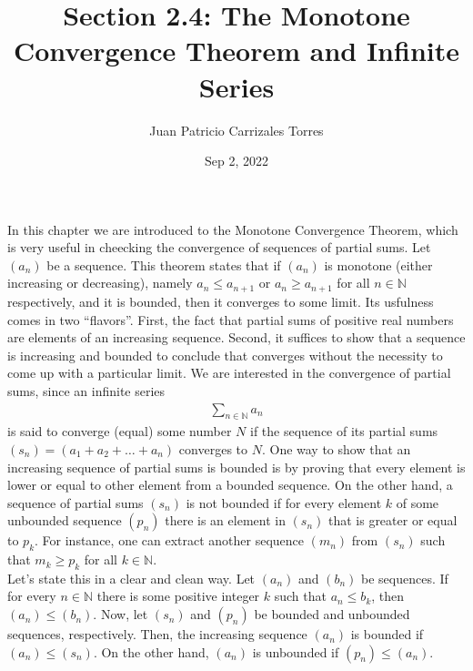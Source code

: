 \documentclass[12pt]{article}
\newcommand{\N}{\mathbb{N}}
\begin{document}
  
\title{Section 2.4: The Monotone Convergence Theorem and Infinite Series}
   \author{Juan Patricio Carrizales Torres}
     \date{Sep 2, 2022}
       \maketitle

       In this chapter we are introduced to the Monotone Convergence Theorem, which is very useful in cheecking the convergence of sequences of partial sums. Let $(a_{n})$ be a sequence. This theorem states that if $(a_{n})$ is monotone (either increasing or decreasing), namely $a_{n} \leq a_{n+1}$ or $a_{n}\geq a_{n+1}$ for all $n\in \N$ respectively, and it is bounded, then it converges to some limit. Its usfulness comes in two ``flavors''. First, the fact that partial sums of positive real numbers are elements of an increasing sequence. Second, it suffices to show that a sequence is increasing and bounded to conclude that converges without the necessity to come up with a particular limit. 
       We are interested in the convergence of partial sums, since an infinite series
\begin{align*}
  \sum_{n\in\N} a_{n}
\end{align*}
is said to converge (equal) some number $N$ if the sequence of its partial sums $(s_{n}) = (a_{1}+a_{2}+\dots+a_{n})$ converges to $N$. 
One way to show that an increasing sequence of partial sums  is bounded is by proving that every element is lower or equal to other element from a bounded sequence. On the other hand, a sequence of partial sums $(s_{n})$ is not bounded if for every element $k$ of some unbounded sequence $(p_{n})$ there is an element in $(s_{n})$ that is greater or equal to $p_{k}$. For instance, one can extract another sequence $(m_{n})$ from $(s_{n})$ such that $m_{k} \geq p_{k}$ for all $k\in\N$.\\
Let's state this in a clear and clean way. Let $(a_{n})$ and $(b_{n})$ be sequences. If for every $n\in\N$ there is some positive integer $k$ such that $a_{n}\leq b_{k}$, then $(a_{n})\leq (b_{n})$. Now, let $(s_{n})$ and $(p_{n})$ be bounded and unbounded sequences, respectively. Then, the increasing sequence $(a_{n})$ is bounded if $(a_{n})\leq (s_{n})$. On the other hand, $(a_{n})$ is unbounded if $(p_{n}) \leq (a_{n})$.\\
\end{document}
